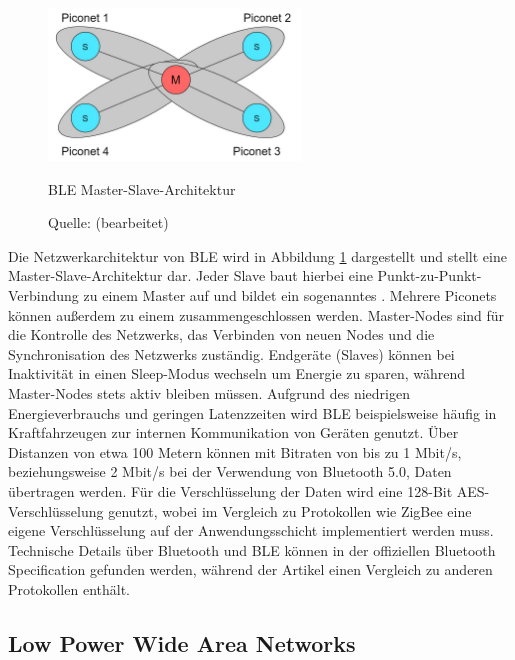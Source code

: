 \begin{figure}[H]
  \vspace{10pt}
  \begin{center}
    \includegraphics[width=0.6\textwidth]{./images/ble-pico.jpg}
  \end{center}
  \vspace{-5pt}
  \caption[BLE Master-Slave-Architektur]{BLE Master-Slave-Architektur}
  \caption*{Quelle: {\cite{IoTAndEdge.2020} (bearbeitet)}}
  \label{fig:ble-pico}
  \vspace{-10pt}
\end{figure}

Die Netzwerkarchitektur von BLE wird in Abbildung \ref{fig:ble-pico} dargestellt und stellt eine Master-Slave-Architektur dar. Jeder Slave baut hierbei eine Punkt-zu-Punkt-Verbindung zu einem Master auf und bildet ein sogenanntes . Mehrere Piconets können außerdem zu einem  zusammengeschlossen werden. Master-Nodes sind für die Kontrolle des Netzwerks, das Verbinden von neuen Nodes und die Synchronisation des Netzwerks zuständig. Endgeräte (Slaves) können bei Inaktivität in einen Sleep-Modus wechseln um Energie zu sparen, während Master-Nodes stets aktiv bleiben müssen. Aufgrund des niedrigen Energieverbrauchs und geringen Latenzzeiten wird BLE beispielsweise häufig in Kraftfahrzeugen zur internen Kommunikation von Geräten genutzt. Über Distanzen von etwa 100 Metern können mit Bitraten von bis zu 1 Mbit/s, beziehungsweise 2 Mbit/s bei der Verwendung von Bluetooth 5.0, Daten übertragen werden. Für die Verschlüsselung der Daten wird eine 128-Bit AES-Verschlüsselung genutzt, wobei im Vergleich zu Protokollen wie ZigBee eine eigene Verschlüsselung auf der Anwendungsschicht implementiert werden muss. Technische Details über Bluetooth und BLE können in der offiziellen Bluetooth Specification  gefunden werden, während der Artikel \cite{Salman.2019} einen Vergleich zu anderen Protokollen enthält.

\subsection{Low Power Wide Area Networks}
\label{sec:ThHi:lpwan}

